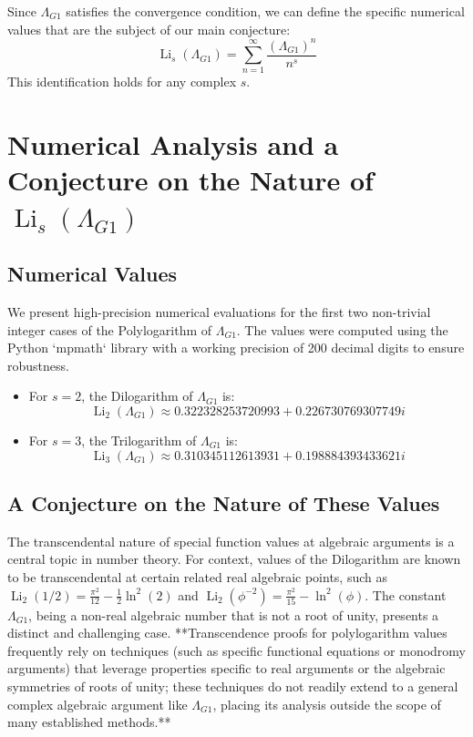 \documentclass{amsart}
\theoremstyle{plain}
\theoremstyle{definition}
\theoremstyle{remark}
\DeclareMathOperator{\Li}{Li} %
\newcommand{\LambdaG}{\Lambda_{G1}}
\newcommand{\phiG}{\phi}
\begin{document}
Since $\LambdaG$ satisfies the convergence condition, we can define the specific numerical values that are the subject of our main conjecture:
$$ \Li_s(\LambdaG) = \sum_{n=1}^{\infty} \frac{(\LambdaG)^{n}}{n^s} $$ 
This identification holds for any complex $s$.

\section{Numerical Analysis and a Conjecture on the Nature of \texorpdfstring{$\Li_s(\LambdaG)$}{Li\_s(Lambda\_G1)}}

\subsection{Numerical Values}
We present high-precision numerical evaluations for the first two non-trivial integer cases of the Polylogarithm of $\LambdaG$. The values were computed using the Python `mpmath` library with a working precision of 200 decimal digits to ensure robustness.
\begin{itemize}
    \item For $s=2$, the Dilogarithm of $\LambdaG$ is:
    $$ \Li_2(\LambdaG) \approx 0.322328253720993 + 0.226730769307749i $$ 
    
    \item For $s=3$, the Trilogarithm of $\LambdaG$ is:
    $$ \Li_3(\LambdaG) \approx 0.310345112613931 + 0.198884393433621i $$ 
    
\end{itemize}

\subsection{A Conjecture on the Nature of These Values}
The transcendental nature of special function values at algebraic arguments is a central topic in number theory. For context, values of the Dilogarithm are known to be transcendental at certain related real algebraic points, such as $\Li_2(1/2) = \frac{\pi^2}{12} - \frac{1}{2}\ln^2(2)$ and $\Li_2(\phiG^{-2}) = \frac{\pi^2}{15} - \ln^2(\phiG)$. The constant $\LambdaG$, being a non-real algebraic number that is not a root of unity, presents a distinct and challenging case. **Transcendence proofs for polylogarithm values frequently rely on techniques (such as specific functional equations or monodromy arguments) that leverage properties specific to real arguments or the algebraic symmetries of roots of unity; these techniques do not readily extend to a general complex algebraic argument like $\LambdaG$, placing its analysis outside the scope of many established methods.**
\end{document}
